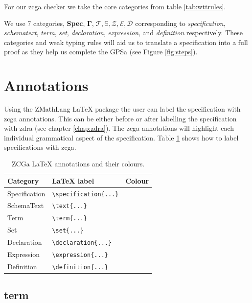 For our \gls{zcga} checker we take the core categories from table \ref{tab:wttrules}.

We use 7 categories, \textbf{Spec}, $\mathbf{\Gamma}$, $\mathcal{T}, \mathbb{S}, \mathcal{Z}, \mathcal{E}, \mathcal{D} $ corresponding to \textit{specification}, \textit{schematext}, \textit{term}, \textit{set}, \textit{declaration}, \textit{expression}, and \textit{definition} respectively.
These categories and weak typing rules will aid us to translate a specification into a full proof as they help us complete the GPSa (see Figure \ref{fig:steps}).

\section{Annotations}

Using the ZMathLang \LaTeX{} package the user can label the specification with \gls{zcga} annotations. This can be either before or after labelling the specification with \gls{zdra} (see chapter \ref{chap:zdra}). The \gls{zcga} annotations will highlight each individual grammatical aspect of the specification. Table \ref{tab:zcgannot} shows how to label specifications with \gls{zcga}.

\begin{table}[H]
\begin{tabular}{| l | l | l |}
\hline
\textbf{Category} & \textbf{\LaTeX{} label} & \textbf{Colour} \\
\hline
\hline
Specification & \verb|\specification{...}| & \specification{} \\
SchemaText & \verb|\text{...}| & \cgatext{} \\
Term & \verb|\term{...}| & \term{} \\
Set & \verb|\set{...}| & \set{} \\
Declaration & \verb|\declaration{...}| & \declaration{} \\
Expression & \verb|\expression{...}| & \expression{} \\
Definition & \verb|\definition{...}| & {} \\
\hline
\end{tabular}
\caption{ZCGa \LaTeX{} annotations and their colours. \label{tab:zcgannot}}
\end{table}

\subsection{term}


